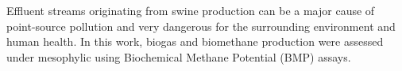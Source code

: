 Effluent streams originating from swine production can be a major cause of point-source pollution and very dangerous for the surrounding environment and human health. In this work, biogas and biomethane production were assessed under mesophylic  using Biochemical Methane Potential (BMP) assays.